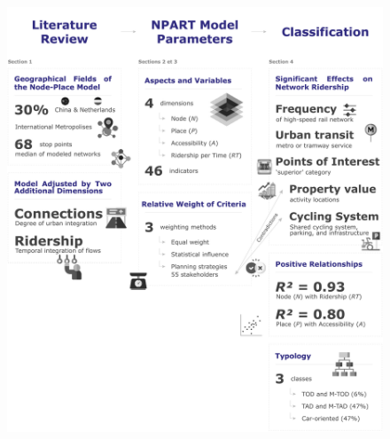 \begin{refsegment}
\begin{figure}[h!]\vspace*{4pt}
        \caption*{}
        \label{graphical-abstract-chap6}
        \centerline{\includegraphics[width=1\columnwidth]{src/Figures/Graphical-abstract/EN_Graphical_abstract_chap6.pdf}}
        \vspace{5pt}
    \end{figure}


\end{refsegment}

